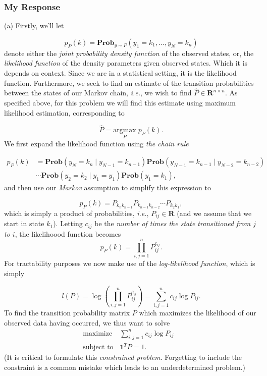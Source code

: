 \documentclass[12pt,reqno]{article}
\theoremstyle{definition}
\numberwithin{equation}{section}
\begin{document}
\subsubsection*{My Response}
\noindent (a) Firstly, we'll let

\[p_{P}(k) = \mathbf{Prob}_{y \sim P}\left(y_1 = k_1, \ldots, y_N = k_n\right)\]
denote either the \textit{joint probability density function} of the observed states, or,
the \textit{likelihood function} of the density parameters given observed states. Which it is depends on context.
Since we are in a statistical setting, it is the likelihood function. Furthermore, we seek to find an estimate
of the transition probabilities between the states of our Markov chain, \textit{i.e.}, we wish to find $\hat{P} \in \mathbf{R}^{n \times n}$.
As specified above, for this problem we will find this estimate using maximum likelihood estimation, corresponding to 

\[\hat{P} = \underset{P}{\mathrm{argmax}} \; p_P(k). \]
We first expand the likelihood function using \textit{the chain rule}

\[ \begin{aligned}
    p_{P}(k) &= \mathbf{Prob}\left(y_{N} = k_n \mid y_{N-1} = k_{n-1}\right) \mathbf{Prob}\left(y_{N-1}=k_{n-1} \mid y_{N-2} = k_{n-2} \right)\\
&\cdots \mathbf{Prob}(y_{2} = k_{2} \mid y_{1} = y_{1}) \mathbf{Prob}\left(y_1 = k_1\right),
\end{aligned} \]
and then use our \textit{Markov} assumption to simplify this expression to

\[p_{P}(k) = P_{k_{n}k_{n-1}}P_{k_{n-1}k_{n-2}} \cdots P_{k_{2}k_{1}},\]
which is simply a product of probabilities, \textit{i.e.}, $P_{ij} \in \mathbf{R}$ (and we assume
that we start in state $k_1$). Letting $c_{ij}$ be the \textit{number of times the state transitioned
from $j$ to $i$}, the likelihoood function becomes
\[p_{P}(k) = \prod_{i, j=1}^{n}P_{ij}^{c_{ij}}.\]
For tractability purposes we now make use of the \textit{log-likelihood function}, which is simply

\[l(P) = \log \left( \prod_{i, j=1}^{n}P_{ij}^{c_{ij}} \right) = \sum_{i, j=1}^{n} c_{ij}\log P_{ij}.\]
To find the transition probability matrix $P$ which maximizes the likelihood of our observed data having occurred,
we thus want to solve
\[\begin{array}{lll}
\text{maximize} \; & \sum_{i, j=1}^{n} c_{ij}\log P_{ij} & \\
\text{subject to} & \bm{1}^T P = 1.
\end{array}\]
(It is critical to formulate this \textit{constrained problem}. Forgetting to include the constraint
is a common mistake which leads to an underdetermined problem.)
\end{document}
